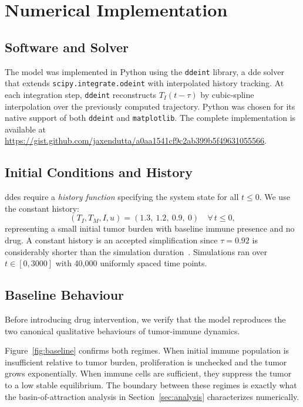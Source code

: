 \section{Numerical Implementation}
\label{sec:implementation}

\subsection{Software and Solver}

The model was implemented in Python using the \texttt{ddeint} library, a \gls{dde} solver that extends \texttt{scipy.integrate.odeint} with interpolated history tracking. At each integration step, \texttt{ddeint} reconstructs $T_I(t - \tau)$ by cubic-spline interpolation over the previously computed trajectory. Python was chosen for its native support of both \texttt{ddeint} and \texttt{matplotlib}. The complete implementation is available at \url{https://gist.github.com/jaxendutta/a0aa1541cf9c2ab399b5f49631055566}.

\subsection{Initial Conditions and History}

\gls{dde}s require a \emph{history function} specifying the system state for all
$t \leq 0$. We use the constant history:
\[
  (T_I, T_M, I, u) = (1.3,\ 1.2,\ 0.9,\ 0) \quad \forall\, t \leq 0,
\]
representing a small initial tumor burden with baseline immune presence and no drug. A constant history is an accepted simplification since $\tau = 0.92$ is considerably shorter than the simulation duration~\cite{villasana_heuristic_2004}. Simulations ran over $t \in [0, 3000]$ with 40,000 uniformly spaced time points.

\subsection{Baseline Behaviour}

Before introducing drug intervention, we verify that the model reproduces the two canonical qualitative behaviours of tumor-immune dynamics.

Figure~\ref{fig:baseline} confirms both regimes. When initial immune population is insufficient relative to tumor burden, proliferation is unchecked and the tumor grows exponentially. When immune cells are sufficient, they suppress the tumor to a low stable equilibrium. The boundary between these regimes is exactly what the basin-of-attraction analysis in Section~\ref{sec:analysis} characterizes numerically.

